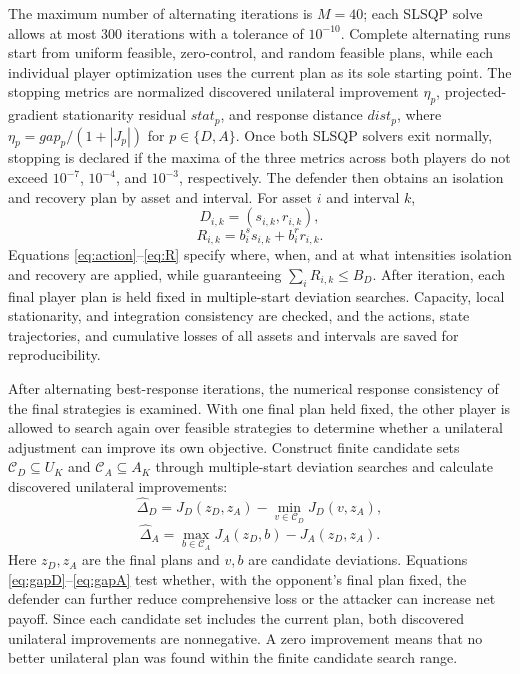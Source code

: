 \documentclass[conference,letterpaper]{IEEEtran}
\begin{document}
The maximum number of alternating iterations is $M=40$; each SLSQP solve allows at most 300 iterations with a tolerance of $10^{-10}$. Complete alternating runs start from uniform feasible, zero-control, and random feasible plans, while each individual player optimization uses the current plan as its sole starting point. The stopping metrics are normalized discovered unilateral improvement $\eta_p$, projected-gradient stationarity residual $stat_p$, and response distance $dist_p$, where $\eta_p=gap_p/(1+|J_p|)$ for $p\in\{D,A\}$. Once both SLSQP solvers exit normally, stopping is declared if the maxima of the three metrics across both players do not exceed $10^{-7}$, $10^{-4}$, and $10^{-3}$, respectively. The defender then obtains an isolation and recovery plan by asset and interval. For asset $i$ and interval $k$,
\begin{equation}\label{eq:action}
D_{i,k}=(s_{i,k},r_{i,k}),
\end{equation}
\begin{equation}\label{eq:R}
R_{i,k}=b_i^s s_{i,k}+b_i^r r_{i,k}.
\end{equation}
Equations \eqref{eq:action}--\eqref{eq:R} specify where, when, and at what intensities isolation and recovery are applied, while guaranteeing $\sum_i R_{i,k}\le B_D$. After iteration, each final player plan is held fixed in multiple-start deviation searches. Capacity, local stationarity, and integration consistency are checked, and the actions, state trajectories, and cumulative losses of all assets and intervals are saved for reproducibility.

After alternating best-response iterations, the numerical response consistency of the final strategies is examined. With one final plan held fixed, the other player is allowed to search again over feasible strategies to determine whether a unilateral adjustment can improve its own objective. Construct finite candidate sets $\mathcal C_D\subseteq U_K$ and $\mathcal C_A\subseteq A_K$ through multiple-start deviation searches and calculate discovered unilateral improvements:
\begin{equation}\label{eq:gapD}
\widehat\Delta_D=J_D(z_D,z_A)-\min_{v\in\mathcal C_D}J_D(v,z_A),
\end{equation}
\begin{equation}\label{eq:gapA}
\widehat\Delta_A=\max_{b\in\mathcal C_A}J_A(z_D,b)-J_A(z_D,z_A).
\end{equation}
Here $z_D,z_A$ are the final plans and $v,b$ are candidate deviations. Equations \eqref{eq:gapD}--\eqref{eq:gapA} test whether, with the opponent's final plan fixed, the defender can further reduce comprehensive loss or the attacker can increase net payoff. Since each candidate set includes the current plan, both discovered unilateral improvements are nonnegative. A zero improvement means that no better unilateral plan was found within the finite candidate search range.
\end{document}
